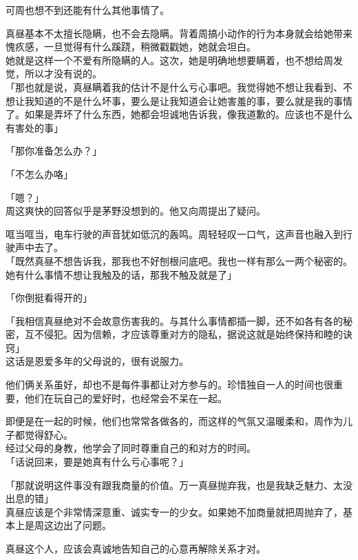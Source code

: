 可周也想不到还能有什么其他事情了。

真昼基本不太擅长隐瞒，也不会去隐瞒。背着周搞小动作的行为本身就会给她带来愧疚感，一旦觉得有什么蹊跷，稍微戳戳她，她就会坦白。\\

她就是这样一个不爱有所隐瞒的人。这次，她是明确地想要瞒着，也不想给周发觉，所以才没有说的。\\

「那也就是说，真昼瞒着我的估计不是什么亏心事吧。我觉得她不想让我看到、不想让我知道的不是什么坏事，要么是让我知道会让她害羞的事，要么就是我的事情了。如果是弄坏了什么东西，她都会坦诚地告诉我，像我道歉的。应该也不是什么有害处的事」

「那你准备怎么办？」

「不怎么办咯」

「嗯？」\\

周这爽快的回答似乎是茅野没想到的。他又向周提出了疑问。

哐当哐当，电车行驶的声音犹如低沉的轰鸣。周轻轻叹一口气，这声音也融入到行驶声中去了。\\

「既然真昼不想告诉我，那我也不好刨根问底吧。我也一样有那么一两个秘密的。她有什么事情不想让我触及的话，那我不触及就是了」

「你倒挺看得开的」

「我相信真昼绝对不会故意伤害我的。与其什么事情都插一脚，还不如各有各的秘密，互不侵犯。因为信赖，才应该尊重对方的隐私，据说这就是始终保持和睦的诀窍」\\

这话是恩爱多年的父母说的，很有说服力。

他们俩关系虽好，却也不是每件事都让对方参与的。珍惜独自一人的时间也很重要，他们在玩自己的爱好时，也经常会不呆在一起。

即便是在一起的时候，他们也常常各做各的，而这样的气氛又温暖柔和，周作为儿子都觉得舒心。\\

经过父母的身教，他学会了同时尊重自己的和对方的时间。\\

「话说回来，要是她真有什么亏心事呢？」

「那就说明这件事没有跟我商量的价值。万一真昼抛弃我，也是我缺乏魅力、太没出息的错」\\

真昼应该是个非常情深意重、诚实专一的少女。如果她不加商量就把周抛弃了，基本上是周这边出了问题。

真昼这个人，应该会真诚地告知自己的心意再解除关系才对。\\

